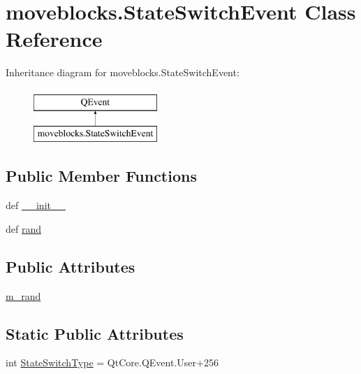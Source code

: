 \hypertarget{classmoveblocks_1_1StateSwitchEvent}{}\section{moveblocks.\+State\+Switch\+Event Class Reference}
\label{classmoveblocks_1_1StateSwitchEvent}
Inheritance diagram for moveblocks.\+State\+Switch\+Event\+:\begin{figure}[H]
\begin{center}
\leavevmode
\includegraphics[height=2.000000cm]{classmoveblocks_1_1StateSwitchEvent}
\end{center}
\end{figure}
\subsection*{Public Member Functions}
\begin{DoxyCompactItemize}
\item 
def \hyperlink{classmoveblocks_1_1StateSwitchEvent_af6b85047ae89ff0d1d1e8aefd02dd9f5}{\+\_\+\+\_\+init\+\_\+\+\_\+}
\item 
def \hyperlink{classmoveblocks_1_1StateSwitchEvent_a06cf2ec236391cbd71575fced6dd651a}{rand}
\end{DoxyCompactItemize}
\subsection*{Public Attributes}
\begin{DoxyCompactItemize}
\item 
\hyperlink{classmoveblocks_1_1StateSwitchEvent_aa47383df4bf16f366d8fe44e088429ef}{m\+\_\+rand}
\end{DoxyCompactItemize}
\subsection*{Static Public Attributes}
\begin{DoxyCompactItemize}
\item 
int \hyperlink{classmoveblocks_1_1StateSwitchEvent_ad8b0247a5387fa6f436121f5f76880d7}{State\+Switch\+Type} = Qt\+Core.\+Q\+Event.\+User+256
\end{DoxyCompactItemize}


